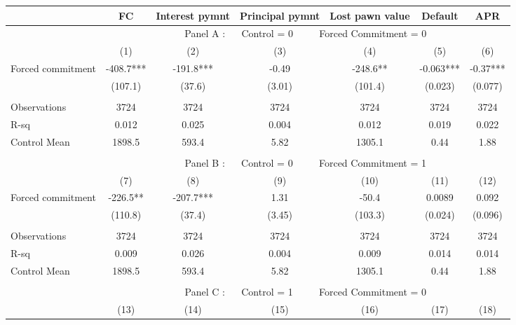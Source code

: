 \begin{tabular}{lcccccc}
\toprule
      & FC    & Interest pymnt & Principal pymnt & Lost pawn value & Default & APR \\
\midrule
      & \multicolumn{6}{c}{Panel A : $\quad$ Control  = 0           $\quad\quad$                  Forced Commitment = 0} \\
\midrule
\midrule
      & (1)   & (2)   & (3)   & (4)   & (5)   & (6) \\
\midrule
\midrule
Forced commitment  & -408.7*** & -191.8*** & -0.49 & -248.6** & -0.063*** & -0.37*** \\
      & (107.1) & (37.6) & (3.01) & (101.4) & (0.023) & (0.077) \\
      &       &       &       &       &       &  \\
\midrule
Observations & 3724  & 3724  & 3724  & 3724  & 3724  & 3724 \\
R-sq  & 0.012 & 0.025 & 0.004 & 0.012 & 0.019 & 0.022 \\
Control Mean & 1898.5 & 593.4 & 5.82  & 1305.1 & 0.44  & 1.88 \\
\midrule
\midrule
      &       &       &       &       &       &  \\
\midrule
      & \multicolumn{6}{c}{Panel B : $\quad$ Control  = 0         $\quad\quad$                    Forced Commitment = 1} \\
\midrule
\midrule
      & (7)   & (8)   & (9)   & (10)  & (11)  & (12) \\
\midrule
\midrule
Forced commitment  & -226.5** & -207.7*** & 1.31  & -50.4 & 0.0089 & 0.092 \\
      & (110.8) & (37.4) & (3.45) & (103.3) & (0.024) & (0.096) \\
      &       &       &       &       &       &  \\
\midrule
Observations & 3724  & 3724  & 3724  & 3724  & 3724  & 3724 \\
R-sq  & 0.009 & 0.026 & 0.004 & 0.009 & 0.014 & 0.014 \\
Control Mean & 1898.5 & 593.4 & 5.82  & 1305.1 & 0.44  & 1.88 \\
\midrule
\midrule
      &       &       &       &       &       &  \\
\midrule
      & \multicolumn{6}{c}{Panel C : $\quad$ Control  = 1        $\quad\quad$                     Forced Commitment = 0} \\
\midrule
\midrule
      & (13)  & (14)  & (15)  & (16)  & (17)  & (18) \\

\end{tabular}
